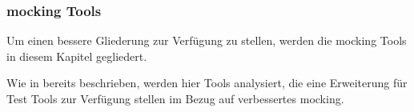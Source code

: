 \subsubsection{\Gls{mock}ing Tools}\label{python-tools:extlib:mock}

Um einen bessere Gliederung zur Verfügung zu stellen, werden die \Gls{mock}ing
Tools in diesem Kapitel gegliedert.

Wie in  bereits beschrieben, werden hier Tools analysiert,
die eine Erweiterung für Test Tools zur Verfügung stellen im Bezug auf verbessertes
\gls{mock}ing.





